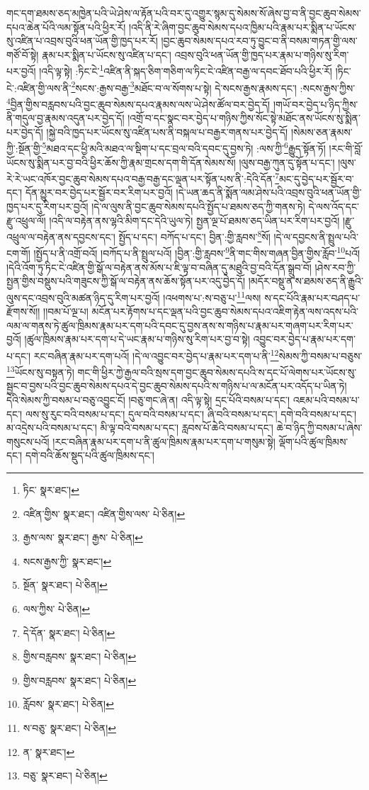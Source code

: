 གང་དག་ཐམས་ཅད་མཁྱེན་པའི་ཡེ་ཤེས་ལ་རྟོན་པའི་བར་དུ་འགྱུར་སྙམ་དུ་སེམས་སོ་ཞེས་བྱ་བ་ནི་བྱང་ཆུབ་སེམས་དཔའ་ཆེན་པོའི་ལམ་སྟོན་པའི་ཕྱིར་རོ། །འདི་ནི་རེ་ཞིག་བྱང་ཆུབ་སེམས་དཔའ་ཁྱིམ་པའི་རྣམ་པར་སྨིན་པ་ཡོངས་སུ་འཛིན་པ་འབྲས་བུའི་ཕན་ཡོན་གྱི་ཁྱད་པར་རོ། །བྱང་ཆུབ་སེམས་དཔའ་རབ་ཏུ་བྱུང་བ་ནི་བསམ་གཏན་གྱི་ལས་གཙོ་བོ་སྟེ། རྣམ་པར་སྨིན་པ་ཡོངས་སུ་འཛིན་པ་དང་། འབྲས་བུའི་ཕན་ཡོན་གྱི་ཁྱད་པར་རྣམ་པ་གཉིས་སུ་རིག་པར་བྱའོ། །འདི་ལྟ་སྟེ། :ཏིང་ངེ་\footnote{ཏིང་  སྣར་ཐང་། }འཛིན་ནི་སྐད་ཅིག་གཅིག་ལ་ཏིང་ངེ་འཛིན་བརྒྱ་ལ་དབང་ཐོབ་པའི་ཕྱིར་རོ། །ཏིང་ངེ་:འཛིན་གྱི་ལས་ནི་\footnote{འཛིན་གྱིས་  སྣར་ཐང་། འཛིན་གྱིས་ལས་  པེ་ཅིན། }སངས་:རྒྱས་བརྒྱ་\footnote{རྒྱས་ལས་  སྣར་ཐང་། རྒྱས་  པེ་ཅིན། }མཐོང་བ་ལ་སོགས་པ་སྟེ། དེ་སངས་རྒྱས་རྣམས་དང་། :སངས་རྒྱས་ཀྱིས་\footnote{སངས་རྒྱས་ཀྱི་  སྣར་ཐང་། }བྱིན་གྱིས་བརླབས་པའི་བྱང་ཆུབ་སེམས་དཔའ་རྣམས་ལས་ཡེ་ཤེས་ཚོལ་བར་བྱེད་དོ། །གཡོ་བར་བྱེད་པ་ཉིད་ཀྱིས་ནི་གདུལ་བྱ་རྣམས་འདུན་པར་བྱེད་དོ། །འགྲོ་བ་དང་སྣང་བར་བྱེད་པ་གཉིས་ཀྱིས་སོང་སྟེ་མཐོང་ནས་ཡོངས་སུ་སྨིན་པར་བྱེད་དོ། །སྐྱེ་བའི་ཁྱད་པར་ཡོངས་སུ་འཛིན་པས་ནི་བསྐལ་པ་བརྒྱར་གནས་པར་བྱེད་དོ། །སེམས་ཅན་རྣམས་ཀྱི་:སྔོན་གྱི་\footnote{སྔོན་  སྣར་ཐང་།  པེ་ཅིན། }མཐའ་དང་ཕྱི་མའི་མཐའ་ལ་སྡིག་པ་དང་བྲལ་བའི་དབང་དུ་བྱས་ཏེ། :ལས་ཀྱི་\footnote{ལས་ཀྱིས་  པེ་ཅིན། }རྒྱུད་སྟོན་ཏོ། །རང་གི་བློ་ཡོངས་སུ་སྨིན་པར་བྱ་བའི་ཕྱིར་ཆོས་ཀྱི་རྣམ་གྲངས་དག་གི་དོན་སེམས་སོ། །ལུས་བརྒྱ་ཀུན་དུ་སྟོན་པ་དང་། །ལུས་རེ་རེ་ཡང་འཁོར་བྱང་ཆུབ་སེམས་དཔའ་བརྒྱ་བརྒྱ་དང་ལྡན་པར་སྟོན་པས་ནི་:དེའི་དོན་\footnote{དེ་དོན་  སྣར་ཐང་།  པེ་ཅིན། }མང་དུ་བྱེད་པར་སྦྱོར་བ་དང་། དོན་མྱུར་བར་བྱེད་པར་སྦྱོར་བར་རིག་པར་བྱའོ། །དེ་ཡན་ཆད་ནི་སྨོན་ལམ་ཤེས་པའི་འབྲས་བུའི་ཕན་ཡོན་གྱི་ཁྱད་པར་དུ་རིག་པར་བྱའོ། །དེ་ལ་ལུས་ནི་བྱང་ཆུབ་སེམས་དཔའི་སྤྱོད་པ་ཐམས་ཅད་ཀྱི་གནས་ཏེ། དེ་ལས་འོད་དང་རྫུ་འཕྲུལ་ལོ། །འདི་ལ་བརྟེན་ནས་ལྷའི་མིག་དང་དེའི་ཡུལ་ཏེ། སྤྱན་ལྔ་པོ་ཐམས་ཅད་ཡིན་པར་རིག་པར་བྱའོ། །རྫུ་འཕྲུལ་ལ་བརྟེན་ནས་དབྱངས་དང་། སྤྱོད་པ་དང་། བཀོད་པ་དང་། བྱིན་:གྱི་རླབས་\footnote{གྱིས་བརླབས་  སྣར་ཐང་།  པེ་ཅིན། }སོ། །དེ་ལ་དབྱངས་ནི་སྤྲུལ་པའི་ངག་གོ། །སྤྱོད་པ་ནི་འགྲོ་བའོ། །བཀོད་པ་ནི་སྤྲུལ་པའོ། །བྱིན་:གྱི་རླབས་\footnote{གྱིས་བརླབས་  སྣར་ཐང་།  པེ་ཅིན། }ནི་གང་གིས་གཞན་བྱིན་གྱིས་རློབ་\footnote{རློབས་  སྣར་ཐང་།  པེ་ཅིན། }པའོ། །དེའི་འོག་ཏུ་ཏིང་ངེ་འཛིན་གྱི་སྒོ་ལ་བརྟེན་ནས་མོས་པ་ཇི་ལྟ་བ་བཞིན་དུ་མཐུའི་བྱ་བའི་དོན་སྒྲུབ་བོ། །ཤེས་རབ་ཀྱི་སྤྱན་གྱིས་བསྡུས་པའི་གཟུངས་ཀྱི་སྒོ་ལ་བརྟེན་ནས་ཆོས་སྟོན་པར་འདུ་བྱེད་དོ། །མདོར་བསྡུ་ན་ས་ཐམས་ཅད་ནི་རྒྱུའི་ལུས་དང་འབྲས་བུའི་མཚན་ཉིད་དུ་རིག་པར་བྱའོ། །འཕགས་པ་:ས་བཅུ་པ་\footnote{ས་བཅུ་  སྣར་ཐང་།  པེ་ཅིན། }ལས། ས་དང་པོའི་རྣམ་པར་བཤད་པ་རྫོགས་སོ།། །།བམ་པོ་ལྔ་པ། མངོན་པར་རྟོགས་པ་དང་ལྡན་པའི་བྱང་ཆུབ་སེམས་དཔའ་འཇིག་རྟེན་ལས་འདས་པའི་ལམ་ལ་གནས་ཏེ་ཚུལ་ཁྲིམས་རྣམ་པར་དག་པའི་དབང་དུ་བྱས་ནས་ས་གཉིས་པ་རྣམ་པར་གཞག་པར་རིག་པར་བྱའོ། །ཚུལ་ཁྲིམས་རྣམ་པར་དག་པ་དེ་ཡང་རྣམ་པ་གཉིས་སུ་རིག་པར་བྱ་བ་སྟེ། འབྱུང་བར་བྱེད་པ་རྣམ་པར་དག་པ་དང་། རང་བཞིན་རྣམ་པར་དག་པའོ། །དེ་ལ་འབྱུང་བར་བྱེད་པ་རྣམ་པར་དག་པ་ནི་\footnote{ན་  སྣར་ཐང་། }སེམས་ཀྱི་བསམ་པ་བཅུས་\footnote{བཅུ་  སྣར་ཐང་།  པེ་ཅིན། }ཡོངས་སུ་བསྟན་ཏེ། གང་གི་ཕྱིར་ཀྱེ་རྒྱལ་བའི་སྲས་དག་བྱང་ཆུབ་སེམས་དཔའི་ས་དང་པོ་ལེགས་པར་ཡོངས་སུ་སྦྱང་བ་བྱས་པའི་བྱང་ཆུབ་སེམས་དཔའ་དེ་བྱང་ཆུབ་སེམས་དཔའི་ས་གཉིས་པ་ལ་མངོན་པར་འདོད་པ་ཡིན་ཏེ། དེའི་སེམས་ཀྱི་བསམ་པ་བཅུ་འབྱུང་ངོ། །བཅུ་གང་ཞེ་ན། འདི་ལྟ་སྟེ། དྲང་པོའི་བསམ་པ་དང་། འཇམ་པའི་བསམ་པ་དང་། ལས་སུ་རུང་བའི་བསམ་པ་དང་། དུལ་བའི་བསམ་པ་དང་། ཞི་བའི་བསམ་པ་དང་། དགེ་བའི་བསམ་པ་དང་། མ་འདྲེས་པའི་བསམ་པ་དང་། མི་ལྟ་བའི་བསམ་པ་དང་། རླབས་པོ་ཆེའི་བསམ་པ་དང་། ཆེ་བ་ཉིད་ཀྱི་བསམ་པ་ཞེས་གསུངས་པའོ། །རང་བཞིན་རྣམ་པར་དག་པ་ནི་ཚུལ་ཁྲིམས་རྣམ་པར་དག་པ་གསུམ་སྟེ། ལྡོག་པའི་ཚུལ་ཁྲིམས་དང་། དགེ་བའི་ཆོས་སྡུད་པའི་ཚུལ་ཁྲིམས་དང་། 